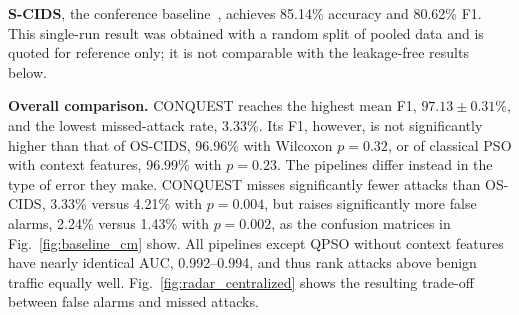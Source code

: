 \documentclass[conference]{IEEEtran}
\begin{document}
\begin{table}[!t]
\centering
\caption{Centralized detection over ten seeds, with Wilcoxon p-values against CONQUEST. \textsuperscript{\textdagger}Conference result~\cite{ajakweconquest}, not directly comparable.}
\label{tab:cyberworm_high_impact}
\setlength{\tabcolsep}{3pt}
\end{table}

\textbf{S-CIDS}, the conference baseline~\cite{ajakweconquest},
achieves 85.14\% accuracy and 80.62\% F1. This single-run result was
obtained with a random split of pooled data and is quoted for
reference only; it is not comparable with the leakage-free results
below.



\textbf{Overall comparison.}
CONQUEST reaches the highest mean F1, $97.13\pm0.31\%$, and the lowest
missed-attack rate, 3.33\%. Its F1, however, is not significantly
higher than that of OS-CIDS, 96.96\% with Wilcoxon $p=0.32$, or of
classical PSO with context features, 96.99\% with $p=0.23$. The
pipelines differ instead in the type of error they make. CONQUEST
misses significantly fewer attacks than OS-CIDS, 3.33\% versus 4.21\%
with $p=0.004$, but raises significantly more false alarms, 2.24\%
versus 1.43\% with $p=0.002$, as the confusion matrices in
Fig.~\ref{fig:baseline_cm} show. All pipelines except QPSO without
context features have nearly identical AUC, 0.992--0.994, and thus
rank attacks above benign traffic equally well.
Fig.~\ref{fig:radar_centralized} shows the resulting trade-off between
false alarms and missed attacks.
\end{document}
